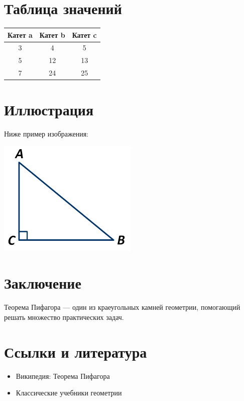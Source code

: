 \documentclass{article}
\begin{document}
\section{Таблица значений}
\begin{center}
\begin{tabular}{|c|c|c|}
\hline
Катет a & Катет b & Катет c \\
\hline
3 & 4 & 5\\
\hline
5 & 12 & 13\\
\hline
7 & 24 & 25\\
\hline
\end{tabular}
\end{center}



\section{Иллюстрация}
Ниже пример изображения:
\begin{center}
\includegraphics[width=0.5\textwidth]{triangle.png}
\end{center}



\section{Заключение}
Теорема Пифагора — один из краеугольных камней геометрии, помогающий решать
множество практических задач.



\section{Ссылки и литература}
\begin{itemize}
    \item Википедия: Теорема Пифагора
    \item Классические учебники геометрии
\end{itemize}
\end{document}
